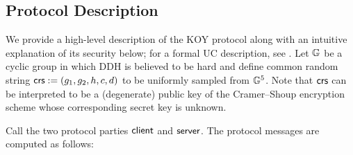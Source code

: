 \subsection{Protocol Description}
\label{description}
We provide a high-level description of the KOY protocol along with an intuitive explanation of its security below; for a formal UC description, see . Let $\mathbb{G}$ be a cyclic group in which DDH is believed to be hard and define common random string $\mathsf{crs} := (g_1, g_2, h, c, d)$ to be uniformly sampled from $\mathbb{G}^5$. Note that $\mathsf{crs}$ can be interpreted to be a (degenerate) public key of the Cramer--Shoup encryption scheme whose corresponding secret key is unknown.

Call the two protocol parties $\mathsf{client}$ and $\mathsf{server}$. The protocol messages are computed as follows:

